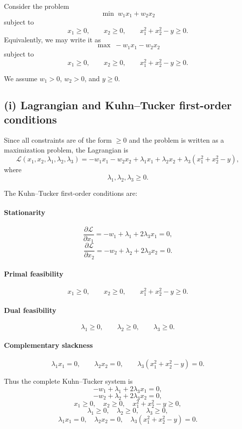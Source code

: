 Consider the problem
\[
\min \; w_1x_1+w_2x_2
\]
subject to
\[
x_1\ge 0,\qquad x_2\ge 0,\qquad x_1^2+x_2^2-y\ge 0.
\]
Equivalently, we may write it as
\[
\max \; -w_1x_1-w_2x_2
\]
subject to
\[
x_1\ge 0,\qquad x_2\ge 0,\qquad x_1^2+x_2^2-y\ge 0.
\]

We assume \(w_1>0\), \(w_2>0\), and \(y\ge 0\).

\subsection*{(i) Lagrangian and Kuhn--Tucker first-order conditions}

Since all constraints are of the form \(\ge 0\) and the problem is written as a maximization problem, the Lagrangian is
\[
\mathcal{L}(x_1,x_2,\lambda_1,\lambda_2,\lambda_3)
=
-w_1x_1-w_2x_2
+\lambda_1x_1+\lambda_2x_2+\lambda_3(x_1^2+x_2^2-y),
\]
where
\[
\lambda_1,\lambda_2,\lambda_3\ge 0.
\]

The Kuhn--Tucker first-order conditions are:

\paragraph{Stationarity}
\[
\frac{\partial \mathcal{L}}{\partial x_1}
=
-w_1+\lambda_1+2\lambda_3x_1=0,
\]
\[
\frac{\partial \mathcal{L}}{\partial x_2}
=
-w_2+\lambda_2+2\lambda_3x_2=0.
\]

\paragraph{Primal feasibility}
\[
x_1\ge 0,\qquad x_2\ge 0,\qquad x_1^2+x_2^2-y\ge 0.
\]

\paragraph{Dual feasibility}
\[
\lambda_1\ge 0,\qquad \lambda_2\ge 0,\qquad \lambda_3\ge 0.
\]

\paragraph{Complementary slackness}
\[
\lambda_1x_1=0,\qquad \lambda_2x_2=0,\qquad \lambda_3(x_1^2+x_2^2-y)=0.
\]

Thus the complete Kuhn--Tucker system is
\[
-w_1+\lambda_1+2\lambda_3x_1=0,
\]
\[
-w_2+\lambda_2+2\lambda_3x_2=0,
\]
\[
x_1\ge 0,\quad x_2\ge 0,\quad x_1^2+x_2^2-y\ge 0,
\]
\[
\lambda_1\ge 0,\quad \lambda_2\ge 0,\quad \lambda_3\ge 0,
\]
\[
\lambda_1x_1=0,\quad \lambda_2x_2=0,\quad \lambda_3(x_1^2+x_2^2-y)=0.
\]

